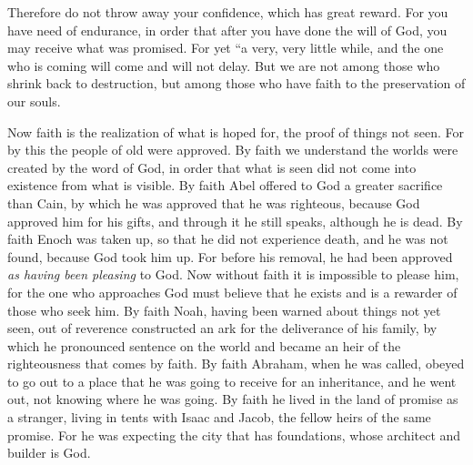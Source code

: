 \begin{biblechapter}
\verse Therefore do not throw away your confidence, which has great reward.
\verse For you have need of endurance, in order that after you have done the will of God, you may receive what was promised.
\verse For yet
\verse “a very, very little while, 
and the one who is coming will come and will not delay.
\verse But we are not among those who shrink back to destruction, but among those who have faith to the preservation of our souls.
\end{biblechapter}

\begin{biblechapter} %
 Now faith is the realization of what is hoped for, the proof of things not seen.
\verse For by this the people of old were approved.
\verse By faith we understand the worlds were created by the word of God, in order that what is seen did not come into existence from what is visible.
\verse By faith Abel offered to God a greater sacrifice than Cain, by which he was approved that he was righteous, because God approved him for his gifts, and through it he still speaks, although he is dead.
\verse By faith Enoch was taken up, so that he did not experience death, and he was not found, because God took him up. For before his removal, he had been approved \textit{as having been pleasing} to God.
\verse Now without faith it is impossible to please him, for the one who approaches God must believe that he exists and is a rewarder of those who seek him.
\verse By faith Noah, having been warned about things not yet seen, out of reverence constructed an ark for the deliverance of his family, by which he pronounced sentence on the world and became an heir of the righteousness that comes by faith.
\verse By faith Abraham, when he was called, obeyed to go out to a place that he was going to receive for an inheritance, and he went out, not knowing where he was going.
\verse By faith he lived in the land of promise as a stranger, living in tents with Isaac and Jacob, the fellow heirs of the same promise.
\verse For he was expecting the city that has foundations, whose architect and builder is God.

\end{biblechapter}
